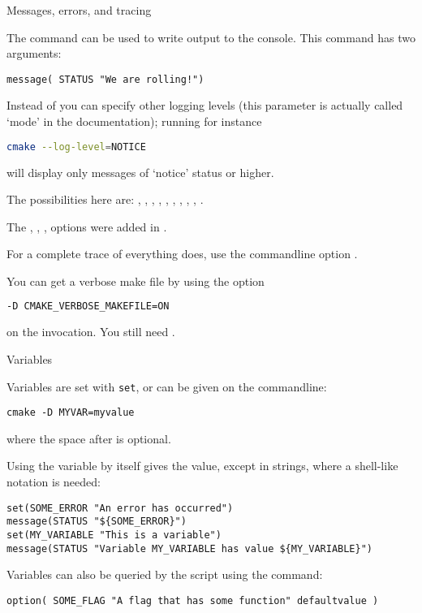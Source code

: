  {Messages, errors, and tracing}

The  command can be used to write output
to the console. This command has two arguments:
\begin{lstlisting}
message( STATUS "We are rolling!")
\end{lstlisting}
Instead of  you can specify other logging levels
(this parameter is actually called `mode' in the documentation);
running for instance
\begin{lstlisting}[language=bash]
cmake --log-level=NOTICE
\end{lstlisting}
will display only messages of `notice' status or higher.

The possibilities here are: , ,
, , , ,
, , , .

The , , ,  options
were added in .

For a complete trace of everything  does, use
the commandline option .

You can get a verbose make file by using the option
\begin{lstlisting}[language=bash]
-D CMAKE_VERBOSE_MAKEFILE=ON
\end{lstlisting}
on the  invocation. You still need .

 {Variables}

Variables are set with \texttt{set},
or can be given on the commandline:
\begin{lstlisting}
cmake -D MYVAR=myvalue
\end{lstlisting}
where the space after  is optional.

Using the variable by itself gives the value,
except in strings, where a shell-like notation is needed:
\begin{lstlisting}
set(SOME_ERROR "An error has occurred")
message(STATUS "${SOME_ERROR}")
set(MY_VARIABLE "This is a variable")
message(STATUS "Variable MY_VARIABLE has value ${MY_VARIABLE}")
\end{lstlisting}

Variables can also be queried by the  script using the  command:
\begin{lstlisting}
option( SOME_FLAG "A flag that has some function" defaultvalue )
\end{lstlisting}

